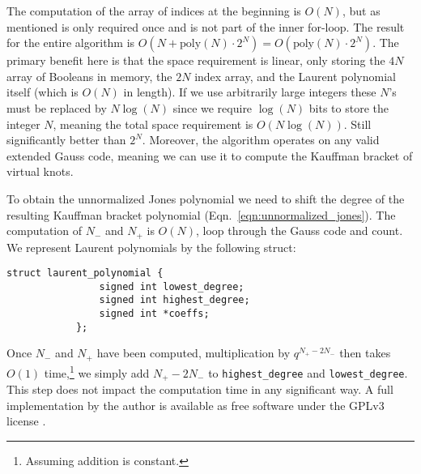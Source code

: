         \par\hfill\par
        The computation of the array of indices at the beginning
        is $O(N)$, but as mentioned is only required once and is not part of
        the inner for-loop. The result for the entire algorithm is
        $O(N+\textrm{poly}(N)\cdot{2}^{N})=O(\textrm{poly}(N)\cdot{2}^{N})$.
        The primary benefit here is that the space
        requirement is linear, only storing the $4N$ array of Booleans in
        memory, the $2N$ index array,
        and the Laurent polynomial itself (which is $O(N)$ in length).
        If we use arbitrarily large integers these $N$'s must be replaced by
        $N\log(N)$ since we require $\log(N)$ bits to store the integer $N$,
        meaning the total space requirement is $O(N\log(N))$.
        Still significantly better than $2^{N}$. Moreover,
        the algorithm operates on any valid extended Gauss code, meaning
        we can use it to compute the Kauffman bracket of virtual knots.
        \par\hfill\par
        To obtain the unnormalized Jones polynomial we need to shift
        the degree of the resulting Kauffman bracket polynomial
        (Eqn.~\ref{eqn:unnormalized_jones}). The computation of $N_{-}$ and
        $N_{+}$ is $O(N)$, loop through the Gauss code and count.
        We represent Laurent polynomials by the following struct:
        \begin{lstlisting}[style=CStyle, gobble=12]
            struct laurent_polynomial {
                signed int lowest_degree;
                signed int highest_degree;
                signed int *coeffs;
            };
        \end{lstlisting}
        Once $N_{-}$ and $N_{+}$ have been computed,
        multiplication by $q^{N_{+}-2N_{-}}$ then takes $O(1)$ time,\footnote{%
            Assuming addition is constant.
        }
        we simply add $N_{+}-2N_{-}$ to \texttt{highest\_degree} and
        \texttt{lowest\_degree}. This step does not impact the computation time
        in any significant way. A full implementation by the author is
        available as free software under the GPLv3 license
        \cite{MaguireJones}.
